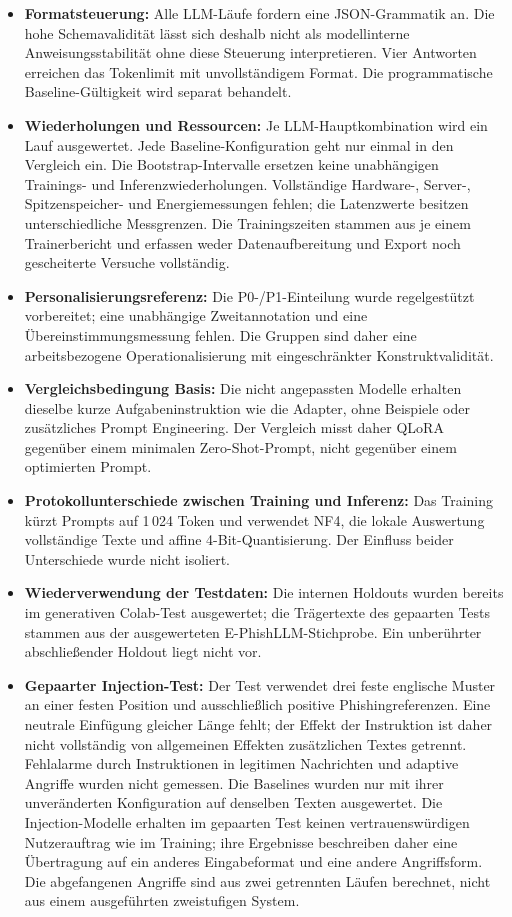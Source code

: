 \documentclass[12pt,twoside=false,a4paper,parskip]{scrbook}
\begin{document}
\begin{itemize}
\item \textbf{Formatsteuerung:} Alle LLM-Läufe fordern eine JSON-Grammatik an. Die hohe Schemavalidität lässt sich deshalb nicht als modellinterne Anweisungsstabilität ohne diese Steuerung interpretieren. Vier Antworten erreichen das Tokenlimit mit unvollständigem Format. Die programmatische Baseline-Gültigkeit wird separat behandelt.
\item \textbf{Wiederholungen und Ressourcen:} Je LLM-Hauptkombination wird ein Lauf ausgewertet. Jede Baseline-Konfiguration geht nur einmal in den Vergleich ein. Die Bootstrap-Intervalle ersetzen keine unabhängigen Trainings- und Inferenzwiederholungen. Vollständige Hardware-, Server-, Spitzenspeicher- und Energiemessungen fehlen; die Latenzwerte besitzen unterschiedliche Messgrenzen. Die Trainingszeiten stammen aus je einem Trainerbericht und erfassen weder Datenaufbereitung und Export noch gescheiterte Versuche vollständig.
\item \textbf{Personalisierungsreferenz:} Die P0-/P1-Einteilung wurde regelgestützt vorbereitet; eine unabhängige Zweitannotation und eine Übereinstimmungsmessung fehlen. Die Gruppen sind daher eine arbeitsbezogene Operationalisierung mit eingeschränkter Konstruktvalidität.
\item \textbf{Vergleichsbedingung Basis:} Die nicht angepassten Modelle erhalten dieselbe kurze Aufgabeninstruktion wie die Adapter, ohne Beispiele oder zusätzliches Prompt Engineering. Der Vergleich misst daher QLoRA gegenüber einem minimalen Zero-Shot-Prompt, nicht gegenüber einem optimierten Prompt.
\item \textbf{Protokollunterschiede zwischen Training und Inferenz:} Das Training kürzt Prompts auf 1\,024 Token und verwendet NF4, die lokale Auswertung vollständige Texte und affine 4-Bit-Quantisierung. Der Einfluss beider Unterschiede wurde nicht isoliert.
\item \textbf{Wiederverwendung der Testdaten:} Die internen Holdouts wurden bereits im generativen Colab-Test ausgewertet; die Trägertexte des gepaarten Tests stammen aus der ausgewerteten E-PhishLLM-Stichprobe. Ein unberührter abschließender Holdout liegt nicht vor.
\item \textbf{Gepaarter Injection-Test:} Der Test verwendet drei feste englische Muster an einer festen Position und ausschließlich positive Phishingreferenzen. Eine neutrale Einfügung gleicher Länge fehlt; der Effekt der Instruktion ist daher nicht vollständig von allgemeinen Effekten zusätzlichen Textes getrennt. Fehlalarme durch Instruktionen in legitimen Nachrichten und adaptive Angriffe wurden nicht gemessen. Die Baselines wurden nur mit ihrer unveränderten Konfiguration auf denselben Texten ausgewertet. Die Injection-Modelle erhalten im gepaarten Test keinen vertrauenswürdigen Nutzerauftrag wie im Training; ihre Ergebnisse beschreiben daher eine Übertragung auf ein anderes Eingabeformat und eine andere Angriffsform. Die abgefangenen Angriffe sind aus zwei getrennten Läufen berechnet, nicht aus einem ausgeführten zweistufigen System.

\end{itemize}
\end{document}
